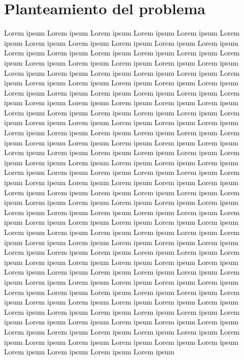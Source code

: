\documentclass[12pt]{article}
\begin{document}
\section{Planteamiento del problema} 


Lorem ipsum Lorem ipsum Lorem ipsum Lorem ipsum Lorem ipsum Lorem ipsum Lorem ipsum Lorem ipsum Lorem ipsum Lorem ipsum Lorem ipsum Lorem ipsum Lorem ipsum Lorem ipsum Lorem ipsum Lorem ipsum Lorem ipsum Lorem ipsum Lorem ipsum Lorem ipsum Lorem ipsum Lorem ipsum Lorem ipsum Lorem ipsum Lorem ipsum Lorem ipsum Lorem ipsum Lorem ipsum Lorem ipsum Lorem ipsum Lorem ipsum Lorem ipsum Lorem ipsum Lorem ipsum Lorem ipsum Lorem ipsum
Lorem ipsum Lorem ipsum Lorem ipsum Lorem ipsum Lorem ipsum Lorem ipsum Lorem ipsum Lorem ipsum Lorem ipsum Lorem ipsum Lorem ipsum Lorem ipsum Lorem ipsum Lorem ipsum Lorem ipsum Lorem ipsum Lorem ipsum Lorem ipsum Lorem ipsum Lorem ipsum Lorem ipsum Lorem ipsum Lorem ipsum Lorem ipsum Lorem ipsum Lorem ipsum Lorem ipsum Lorem ipsum Lorem ipsum Lorem ipsum Lorem ipsum Lorem ipsum Lorem ipsum Lorem ipsum Lorem ipsum Lorem ipsum 
Lorem ipsum Lorem ipsum Lorem ipsum Lorem ipsum Lorem ipsum Lorem ipsum Lorem ipsum Lorem ipsum Lorem ipsum Lorem ipsum Lorem ipsum Lorem ipsum Lorem ipsum Lorem ipsum Lorem ipsum Lorem ipsum Lorem ipsum Lorem ipsum Lorem ipsum Lorem ipsum Lorem ipsum Lorem ipsum Lorem ipsum Lorem ipsum Lorem ipsum Lorem ipsum Lorem ipsum Lorem ipsum Lorem ipsum Lorem ipsum Lorem ipsum Lorem ipsum Lorem ipsum Lorem ipsum Lorem ipsum Lorem ipsum 
Lorem ipsum Lorem ipsum Lorem ipsum Lorem ipsum Lorem ipsum Lorem ipsum Lorem ipsum Lorem ipsum Lorem ipsum Lorem ipsum Lorem ipsum Lorem ipsum Lorem ipsum Lorem ipsum Lorem ipsum Lorem ipsum Lorem ipsum Lorem ipsum Lorem ipsum Lorem ipsum Lorem ipsum Lorem ipsum Lorem ipsum Lorem ipsum Lorem ipsum Lorem ipsum Lorem ipsum Lorem ipsum Lorem ipsum Lorem ipsum Lorem ipsum Lorem ipsum Lorem ipsum Lorem ipsum Lorem ipsum Lorem ipsum 
Lorem ipsum Lorem ipsum Lorem ipsum Lorem ipsum Lorem ipsum Lorem ipsum Lorem ipsum Lorem ipsum Lorem ipsum Lorem ipsum Lorem ipsum Lorem ipsum Lorem ipsum Lorem ipsum Lorem ipsum Lorem ipsum Lorem ipsum Lorem ipsum Lorem ipsum Lorem ipsum Lorem ipsum Lorem ipsum Lorem ipsum Lorem ipsum Lorem ipsum Lorem ipsum Lorem ipsum Lorem ipsum Lorem ipsum Lorem ipsum Lorem ipsum Lorem ipsum Lorem ipsum Lorem ipsum Lorem ipsum Lorem ipsum \cite{IEEEreferencias:Ref2}
\end{document}
